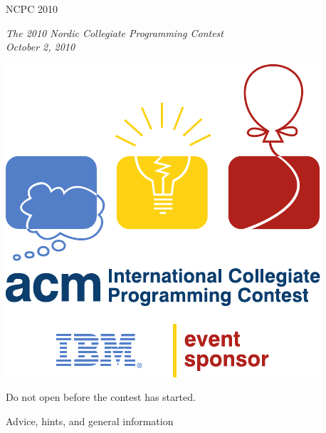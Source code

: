 





\thispagestyle{empty}
\begin{center}
\textsf{\Huge NCPC 2010}

\vspace*{5mm}
\textsf{\textsl{\Large
    The 2010 Nordic Collegiate Programming Contest\\
    October 2, 2010}}

\vspace*{5mm}
\includegraphics[scale=0.75]{icpc} 

\vspace*{5mm}
{
\renewcommand{\contentsname}{{\Huge\sf The Problem Set}}
\LARGE\sf
\tableofcontents
}

\vspace{20mm}

{
\Large\sf
Do not open before the contest has started.
}

\end{center}

\clearpage


{\Large Advice, hints, and general information}

